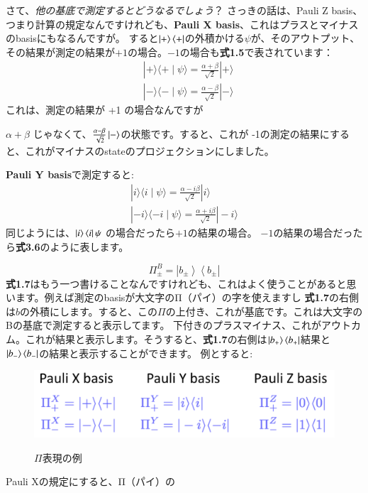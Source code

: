 さて、\textit{他の基底で測定するとどうなるでしょう}？
さっきの話は、Pauli Z basis、つまり計算の規定なんですけれども、\textbf{Pauli X basis}、これはプラスとマイナスのbasisにもなるんですが。
すると$\ket{+}\bra{+}$の外積かける$\psi$が、そのアウトプット、その結果が測定の結果が$+1$の場合。$-1$の場合も\textbf{式1.5}で表されています：
\begin{equation}
\begin{aligned}
&|+\rangle\langle+\mid \psi\rangle=\frac{\alpha+\beta}{\sqrt{2}}|+\rangle \\
&|-\rangle\langle-\mid \psi\rangle=\frac{\alpha-\beta}{\sqrt{2}}|-\rangle
\end{aligned}
\end{equation}
これは、測定の結果が +1 の場合なんですが

$\alpha+\beta$ じゃなくて、$\frac{\alpha-\beta}{\sqrt{2}}\ket{-}$の状態です。すると、これが -1の測定の結果にすると、これがマイナスのstateのプロジェクションにしました。

\textbf{Pauli Y basis}で測定すると:
\begin{equation}
\begin{gathered}
|i\rangle\langle i \mid \psi\rangle=\frac{\alpha-i \beta}{\sqrt{2}}|i\rangle \\
|-i\rangle\langle-i \mid \psi\rangle=\frac{\alpha+i \beta}{\sqrt{2}}|-i\rangle
\end{gathered}
\end{equation}
同じようには、$\ket{i}\bra{i}\psi$ の場合だったら$+1$の結果の場合。
$-1$の結果の場合だったら\textbf{式3.6}のように表します。


\begin{equation}
\Pi_{\pm}^{B}=\left|b_{\pm}\right\rangle\left\langle b_{\pm}\right|
\end{equation}
\textbf{式1.7}はもう一つ書けることなんですけれども、これはよく使うことがあると思います。例えば測定のbasisが大文字のΠ（パイ）の字を使えますし
\textbf{式1.7}の右側は$b$の外積にします。すると、この$\Pi$の上付き、これが基底です。これは大文字のBの基底で測定すると表示してます。
下付きのプラスマイナス、これがアウトカム。これが結果と表示します。そうすると、\textbf{式1.7}の右側は$\ket{b_+}\bra{b_+}$結果と$\ket{b_-}\bra{b_-}$の結果と表示することができます。
例とすると:
\begin{figure}[H]
    \centering
    \includegraphics[width=1.0\textwidth]{lesson3/outer_product_examples.png}
    \label{fig: 1}
    \begin{center}
        \caption{$\Pi$表現の例}
    \end{center}
\end{figure}
\iffalse
Pauli Xの規定にすると、Π（パイ）の

